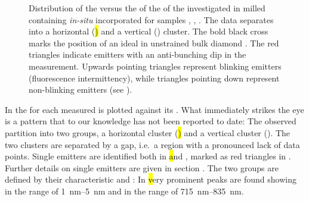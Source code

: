 	\begin{figure}[!htb]
			\centering
			\caption[Spectral distribution of \siv \ZPLs]{Distribution of the \ZPL \cwl versus the \lw of the \ZPL of the investigated \sivs in milled \nds containing \textit{in-situ} incorporated \sivs for samples \insituF, \insituS, \insituH{}. The data separates into a horizontal (\hl) and a vertical (\vl) cluster. The bold black cross marks the position of an ideal \siv in unstrained bulk diamond \cite{Arend2016a}. The red triangles indicate emitters with an anti-bunching dip in the \gtz measurement. Upwards pointing triangles represent blinking emitters (fluorescence intermittency), while triangles pointing down represent non-blinking emitters (see ).}
			\label{fig::bimodal_distr}
	\end{figure}

	In  the \lw for each measured \ZPL is plotted against its \cwl.
	What immediately strikes the eye is a pattern that to our knowledge has not been reported to date:
	The observed \ZPLs partition into two groups, a horizontal cluster (\hl) and a vertical cluster (\vl). The two clusters are separated by a gap, i.e.\ a region with a pronounced lack of data points.
	Single emitters are identified both in \hl and \vl, marked as red triangles in . Further details on single emitters are given in section .
	The two groups are defined by their characteristic \cwls and \lws:
	In \hl very prominent \ZPL peaks are found showing \lws in the range of \SIrange{1}{5}{nm} and \cwls in the range of \SIrange{715}{835}{nm}.


